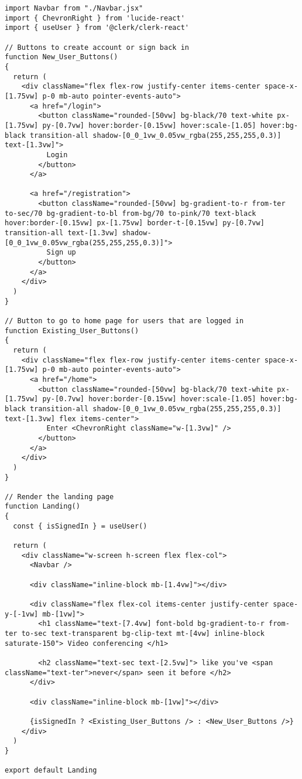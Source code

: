 \begin{verbatim}
import Navbar from "./Navbar.jsx"
import { ChevronRight } from 'lucide-react'
import { useUser } from '@clerk/clerk-react'

// Buttons to create account or sign back in
function New_User_Buttons()
{
  return (
    <div className="flex flex-row justify-center items-center space-x-[1.75vw] p-0 mb-auto pointer-events-auto">
      <a href="/login">
        <button className="rounded-[50vw] bg-black/70 text-white px-[1.75vw] py-[0.7vw] hover:border-[0.15vw] hover:scale-[1.05] hover:bg-black transition-all shadow-[0_0_1vw_0.05vw_rgba(255,255,255,0.3)] text-[1.3vw]">
          Login
        </button>
      </a>

      <a href="/registration">
        <button className="rounded-[50vw] bg-gradient-to-r from-ter to-sec/70 bg-gradient-to-bl from-bg/70 to-pink/70 text-black hover:border-[0.15vw] px-[1.75vw] border-t-[0.15vw] py-[0.7vw] transition-all text-[1.3vw] shadow-[0_0_1vw_0.05vw_rgba(255,255,255,0.3)]">
          Sign up
        </button>
      </a>
    </div>
  )
}

// Button to go to home page for users that are logged in
function Existing_User_Buttons()
{
  return (
    <div className="flex flex-row justify-center items-center space-x-[1.75vw] p-0 mb-auto pointer-events-auto">
      <a href="/home">
        <button className="rounded-[50vw] bg-black/70 text-white px-[1.75vw] py-[0.7vw] hover:border-[0.15vw] hover:scale-[1.05] hover:bg-black transition-all shadow-[0_0_1vw_0.05vw_rgba(255,255,255,0.3)] text-[1.3vw] flex items-center">
          Enter <ChevronRight className="w-[1.3vw]" />
        </button>
      </a>
    </div>
  )
}

// Render the landing page
function Landing()
{
  const { isSignedIn } = useUser()

  return (
    <div className="w-screen h-screen flex flex-col">
      <Navbar />

      <div className="inline-block mb-[1.4vw]"></div>

      <div className="flex flex-col items-center justify-center space-y-[-1vw] mb-[1vw]">
        <h1 className="text-[7.4vw] font-bold bg-gradient-to-r from-ter to-sec text-transparent bg-clip-text mt-[4vw] inline-block saturate-150"> Video conferencing </h1>

        <h2 className="text-sec text-[2.5vw]"> like you've <span className="text-ter">never</span> seen it before </h2>
      </div>

      <div className="inline-block mb-[1vw]"></div>

      {isSignedIn ? <Existing_User_Buttons /> : <New_User_Buttons />}
    </div>
  )
}

export default Landing
\end{verbatim}

